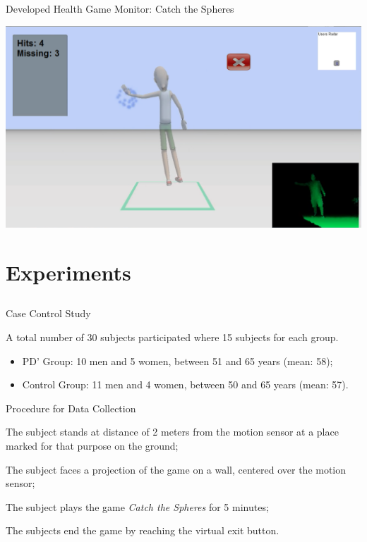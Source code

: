 \documentclass{beamer}
\begin{document}
\begin{frame}{Developed Health Game Monitor: Catch the Spheres}
	\begin{center}
      \center \includegraphics[height=2.2 in]{img/catch_colour.png}
	\end{center}
\end{frame}

\section{Experiments}
\subsection{}
\begin{frame}{Case Control Study}
	\begin{block}{}
	A total number of 30 subjects participated where 15 subjects for each group.
		\begin{itemize}
			\item PD' Group: 10 men and 5 women, between 51 and 65 years (mean: 58);
			\item Control Group: 11 men and 4 women, between 50 and 65 years (mean: 57).
		\end{itemize}
	\end{block}
\end{frame}

\begin{frame}{Procedure for Data Collection}
	\begin{block}{}
	\begin{compactenum}
	\item The subject stands at distance of 2 meters from the motion sensor at a place marked for that purpose on the ground;
	\item The subject faces a projection of the game on a wall, centered over the motion sensor;
	\item The subject plays the game \textit{Catch the Spheres} for 5 minutes;
	\item The subjects end the game by reaching the virtual exit button.
\end{compactenum} 
	\end{block}
\end{frame}
\end{document}
